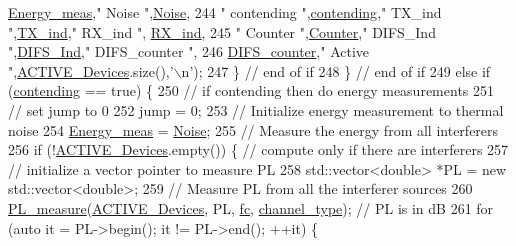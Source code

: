 \begin{DoxyCode}
      \hyperlink{classAP_a71f625e0df8f494e53ab6e27a2e96bd9}{Energy\_meas},\textcolor{stringliteral}{" Noise "},\hyperlink{classAP_ae865c89ed6f1bace113d6ddb1a4f41d3}{Noise},
244       \textcolor{stringliteral}{" contending "},\hyperlink{classAP_afe722094c1dea7972332a788411cc488}{contending},\textcolor{stringliteral}{" TX\_ind "},\hyperlink{classAP_adce53b419ff50565a7084b8d893c5be1}{TX\_ind},\textcolor{stringliteral}{" RX\_ind "},
      \hyperlink{classAP_af5b1c2bc10a9ce9f3007bbf37f95f144}{RX\_ind},
245       \textcolor{stringliteral}{" Counter "},\hyperlink{classAP_a4cf433d4becdf9cb836d170133d9d478}{Counter},\textcolor{stringliteral}{" DIFS\_Ind "},\hyperlink{classAP_ae9749297d96e52a95a4f52f795127f8e}{DIFS\_Ind},\textcolor{stringliteral}{" DIFS\_counter "},
246       \hyperlink{classAP_ae8b5098c1fed76aeecdb1ed35f8952a1}{DIFS\_counter},\textcolor{stringliteral}{" Active "},\hyperlink{classAP_ab6dd8d2144b1be8dea239c3d76fc60cd}{ACTIVE\_Devices}.size(),\textcolor{charliteral}{'\(\backslash\)n'});    
247         \} \textcolor{comment}{// end of if}
248     \} \textcolor{comment}{// end of if}
249     \textcolor{keywordflow}{else} \textcolor{keywordflow}{if} (\hyperlink{classAP_afe722094c1dea7972332a788411cc488}{contending} == \textcolor{keyword}{true}) \{
250         \textcolor{comment}{// if contending then do energy measurements}
251         \textcolor{comment}{// set jump to 0 }
252         jump = 0;
253         \textcolor{comment}{// Initialize energy measurement to thermal noise}
254         \hyperlink{classAP_a71f625e0df8f494e53ab6e27a2e96bd9}{Energy\_meas} = \hyperlink{classAP_ae865c89ed6f1bace113d6ddb1a4f41d3}{Noise};
255         \textcolor{comment}{// Measure the energy from all interferers}
256         \textcolor{keywordflow}{if} (!\hyperlink{classAP_ab6dd8d2144b1be8dea239c3d76fc60cd}{ACTIVE\_Devices}.empty()) \{ \textcolor{comment}{// compute only if there are interferers}
257             \textcolor{comment}{// initialize a vector pointer to measure PL}
258             std::vector<double> *PL = \textcolor{keyword}{new} std::vector<double>;
259             \textcolor{comment}{// Measure PL from all the interferer sources}
260             \hyperlink{PL__measure_8cpp_afb433c5f099becf495d3c9d29ffc707d}{PL\_measure}(\hyperlink{classAP_ab6dd8d2144b1be8dea239c3d76fc60cd}{ACTIVE\_Devices}, PL, \hyperlink{classAP_af7f928faaa72cbfe5c4f905cb146a564}{fc}, 
      \hyperlink{classAP_a334f5b7be9725824797db57032de80e2}{channel\_type}); \textcolor{comment}{// PL is in dB}
261             \textcolor{keywordflow}{for} (\textcolor{keyword}{auto} it = PL->begin(); it != PL->end(); ++it) \{

\end{DoxyCode}
